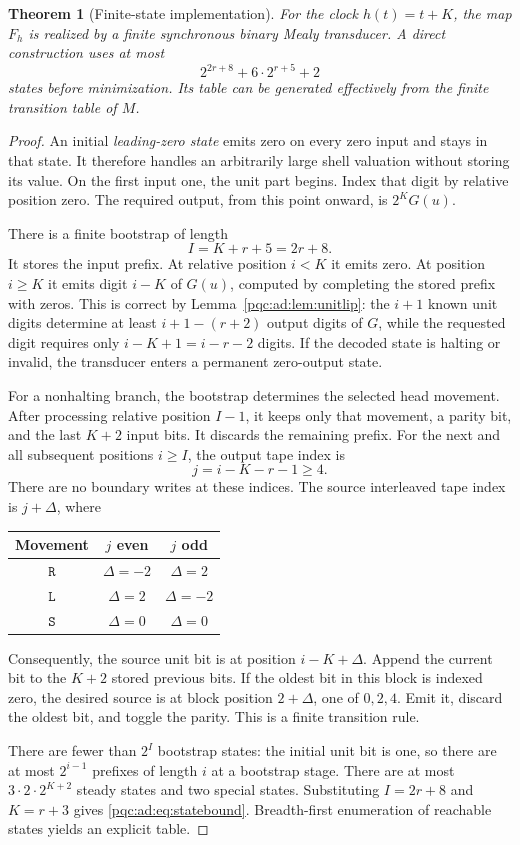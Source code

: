 \documentclass[11pt,letterpaper]{article}
\numberwithin{equation}{section}
\newtheorem{theorem}{Theorem}[section]
\theoremstyle{definition}
\theoremstyle{remark}
\newcommand{\blank}{\mathtt{S}}
\newcommand{\moveL}{\mathtt{L}}
\newcommand{\moveR}{\mathtt{R}}
\begin{document}
\begin{theorem}[Finite-state implementation]\label{pqc:ad:thm:mealy}
For the clock $h(t)=t+K$, the map $F_h$ is realized by a finite synchronous
binary Mealy transducer. A direct construction uses at most
\begin{equation}\label{pqc:ad:eq:statebound}
2^{2r+8}+6\cdot2^{r+5}+2
\end{equation}
states before minimization. Its table can be generated effectively from
the finite transition table of $M$.
\end{theorem}
\begin{proof}
An initial \emph{leading-zero state} emits zero on every zero input and
stays in that state. It therefore handles an arbitrarily large shell
valuation without storing its value. On the first input one, the unit
part begins. Index that digit by relative position zero. The required
output, from this point onward, is $2^K G(u)$.

There is a finite bootstrap of length
\[
I=K+r+5=2r+8.
\]
It stores the input prefix. At relative position $i<K$ it emits zero. At
position $i\ge K$ it emits digit $i-K$ of $G(u)$, computed by completing
the stored prefix with zeros. This is correct by
Lemma~\ref{pqc:ad:lem:unitlip}: the $i+1$ known unit digits determine at least
$i+1-(r+2)$ output digits of $G$, while the requested digit requires only
$i-K+1=i-r-2$ digits. If the decoded state is halting or invalid, the
transducer enters a permanent zero-output state.

For a nonhalting branch, the bootstrap determines the selected head
movement. After processing relative position $I-1$, it keeps only that
movement, a parity bit, and the last $K+2$ input bits. It discards the
remaining prefix. For the next and all subsequent positions $i\ge I$,
the output tape index is
\[
j=i-K-r-1\ge4.
\]
There are no boundary writes at these indices. The source interleaved
tape index is $j+\Delta$, where
\begin{center}
\begin{tabular}{@{}c cc@{}}
\toprule
Movement & $j$ even & $j$ odd\\
\midrule
$\moveR$ & $\Delta=-2$ & $\Delta=2$\\
$\moveL$ & $\Delta=2$ & $\Delta=-2$\\
$\blank$ & $\Delta=0$ & $\Delta=0$\\
\bottomrule
\end{tabular}
\end{center}
Consequently, the source unit bit is at position $i-K+\Delta$.
Append the current bit to the $K+2$ stored previous bits. If the oldest
bit in this block is indexed zero, the desired source is at block position
$2+\Delta$, one of $0,2,4$. Emit it, discard the oldest bit, and toggle the
parity. This is a finite transition rule.

There are fewer than $2^I$ bootstrap states: the initial unit bit is one,
so there are at most $2^{i-1}$ prefixes of length $i$ at a bootstrap stage.
There are at most $3\cdot2\cdot2^{K+2}$ steady states and two special
states. Substituting $I=2r+8$ and $K=r+3$ gives \eqref{pqc:ad:eq:statebound}.
Breadth-first enumeration of reachable states yields an explicit table.
\end{proof}
\end{document}
